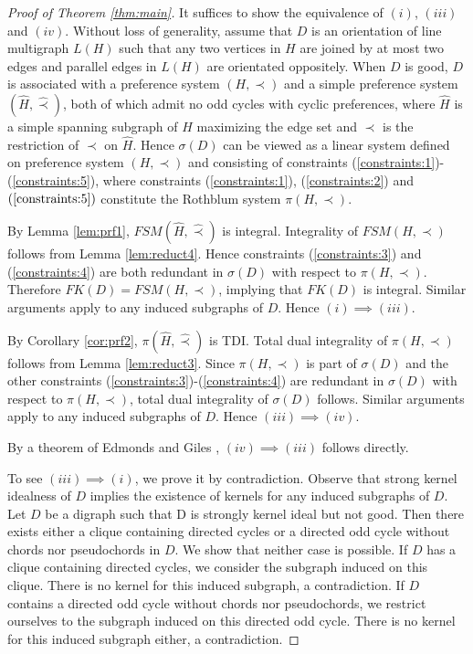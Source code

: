 \documentclass[11pt]{article}
\numberwithin{theorem}{section}
\begin{document}
\begin{proof}[Proof of Theorem \ref{thm:main}]
It suffices to show the equivalence of $(i)$, $(iii)$ and $(iv)$. Without loss of generality, assume that $D$ is an orientation of line multigraph $L(H)$ such that any two vertices in $H$ are joined by at most two edges and parallel edges in $L(H)$ are orientated oppositely. When $D$ is good, $D$ is associated with a preference system $(H,\prec)$ and a simple preference system $(\hat{H},\hat\prec)$, both of which admit no odd cycles with cyclic preferences, where $\hat{H}$ is a simple spanning subgraph of $H$ maximizing the edge set and $\hat\prec$ is the restriction of $\prec$ on $\hat{H}$.
Hence $\sigma(D)$ can be viewed as a linear system defined on preference system $(H,\prec)$ and consisting of constraints (\ref{constraints:1})-(\ref{constraints:5}), where constraints (\ref{constraints:1}), (\ref{constraints:2}) and $(\ref{constraints:5})$ constitute the Rothblum system $\pi(H,\prec)$.

By Lemma \ref{lem:prf1}, $FSM(\hat{H},\hat\prec)$ is integral. Integrality of $FSM(H,\prec)$ follows from Lemma \ref{lem:reduct4}. Hence constraints (\ref{constraints:3}) and (\ref{constraints:4}) are both redundant in $\sigma(D)$ with respect to $\pi(H,\prec)$. Therefore $FK(D)=FSM(H,\prec)$, implying that $FK(D)$ is integral. Similar arguments apply to any induced subgraphs of $D$. Hence $(i)\implies (iii)$. 

By Corollary \ref{cor:prf2}, $\pi(\hat{H},\hat\prec)$ is TDI. Total dual integrality of $\pi(H,\prec)$ follows from Lemma \ref{lem:reduct3}. Since $\pi(H,\prec)$ is part of $\sigma(D)$ and the other constraints (\ref{constraints:3})-(\ref{constraints:4}) are redundant in $\sigma(D)$ with respect to $\pi(H,\prec)$, total dual integrality of $\sigma(D)$ follows. Similar arguments apply to any induced subgraphs of $D$. Hence $(iii)\implies (iv)$.

By a theorem of Edmonds and Giles \cite{EdmoGile77}, $(iv)\implies (iii)$ follows directly.

To see $(iii)\implies (i)$, we prove it by contradiction. Observe that strong kernel idealness of  $D$ implies the existence of kernels for any induced subgraphs of $D$. Let $D$ be a digraph such that D is strongly kernel ideal but not good. Then there exists either a clique containing directed cycles or a directed odd cycle without chords nor pseudochords in $D$. We show that neither case is possible. If $D$ has a clique containing directed cycles, we consider the subgraph induced on this clique. There is no kernel for this induced subgraph, a contradiction. If $D$ contains a directed odd cycle without chords nor pseudochords, we restrict ourselves to the subgraph induced on this directed odd cycle. There is no kernel for this induced subgraph either, a contradiction.
\end{proof}




\nocite{Schr86}
\end{document}

